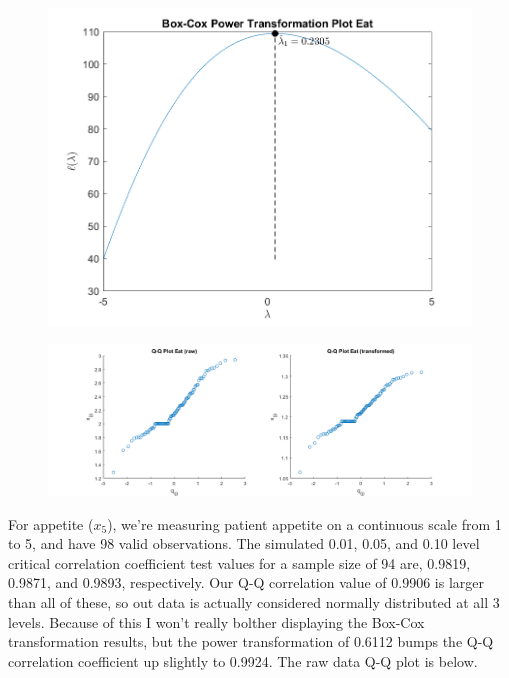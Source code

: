 \begin{center}
    \begin{figure}[H]
        \centering
        \includegraphics[scale=0.6]{./matlab/chapter-4/sol4.32.power.4.png}
    \end{figure}
\end{center}

\begin{center}
    \begin{figure}[H]
        \centering
        \includegraphics[scale=0.4]{./matlab/chapter-4/sol4.32.qq.4.png}
    \end{figure}
\end{center}

For appetite ($x_{5}$), we're measuring patient appetite on a continuous scale from 1 to 5, and have 98 valid observations. The simulated 0.01, 0.05, and 0.10 level critical correlation coefficient test values for a sample size of 94 are, 0.9819, 0.9871, and 0.9893, respectively. Our Q-Q correlation value of 0.9906 is larger than all of these, so out data is actually considered normally distributed at all 3 levels. Because of this I won't really bolther displaying the Box-Cox transformation results, but the power transformation of 0.6112 bumps the Q-Q correlation coefficient up slightly to 0.9924. The raw data Q-Q plot is below.

